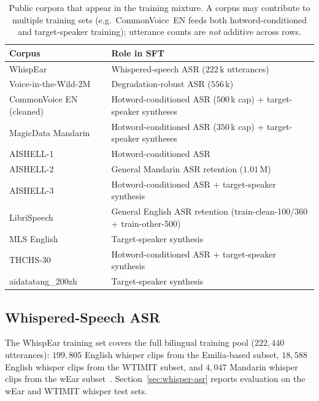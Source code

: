 \begin{table}[t]
  \caption{Public corpora that appear in the training mixture.
    A corpus may contribute to multiple training sets (e.g.\
    CommonVoice~EN feeds both hotword-conditioned and target-speaker
    training); utterance counts are \emph{not} additive across rows.}
  \label{tab:data_public}
  \centering
  \small
  \setlength{\tabcolsep}{4pt}
  \begin{tabular}{p{4.5cm}p{6.8cm}}
    \toprule
    Corpus & Role in SFT \\
    \midrule
    WhispEar \cite{fang2025whisperear}
      & Whispered-speech ASR ($222$\,k utterances) \\
    Voice-in-the-Wild-2M \cite{xie2026mega}
      & Degradation-robust ASR ($556$\,k) \\
    CommonVoice EN (cleaned) \cite{ardila2020commonvoice}
      & Hotword-conditioned ASR ($500$\,k cap) + target-speaker syntheses \\
    MagicData Mandarin \cite{magicdata}
      & Hotword-conditioned ASR ($350$\,k cap) + target-speaker syntheses \\
    AISHELL-1 \cite{bu2017aishell}
      & Hotword-conditioned ASR \\
    AISHELL-2 \cite{du2018aishell2}
      & General Mandarin ASR retention ($1.01$\,M) \\
    AISHELL-3 \cite{shi2021aishell3}
      & Hotword-conditioned ASR + target-speaker synthesis \\
    LibriSpeech \cite{panayotov2015librispeech}
      & General English ASR retention (train-clean-100/360 + train-other-500) \\
    MLS English \cite{pratap2020mls}
      & Target-speaker synthesis \\
    THCHS-30 \cite{wang2015thchs30}
      & Hotword-conditioned ASR + target-speaker synthesis \\
    aidatatang\_200zh
      & Target-speaker synthesis \\
    \bottomrule
  \end{tabular}
\end{table}

\subsection{Whispered-Speech ASR}
\label{subsec:whisper-data}

The WhispEar training set covers the full bilingual training
pool ($222{,}440$ utterances): $199{,}805$ English
whisper clips from the Emilia-based subset, $18{,}588$ English
whisper clips from the WTIMIT subset, and $4{,}047$ Mandarin whisper
clips from the wEar subset~\cite{fang2025whisperear}.
Section~\ref{sec:whisper-asr} reports evaluation on the wEar and
WTIMIT whisper test sets.

